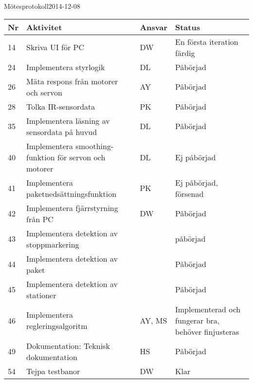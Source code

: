 \documentclass[titlepage, a4paper]{article}
\begin{document}
	\begin{projektmote}{Mötesprotokoll}{2014-12-08}
	\end{projektmote}

	\newpage
	\begin{center}
		\begin{tabularx}{\textwidth}{| p{4mm} | X | p{13.5mm} | X |}
			\hline
			\textbf{Nr} & \textbf{Aktivitet} & \textbf{Ansvar} & \textbf{Status} \\\hline
			{14} & {Skriva UI för PC} & {DW} & {En första iteration färdig} \\\hline
			{24} & {Implementera styrlogik} & {DL} & {Påbörjad} \\\hline
			{26} & {Mäta respons från motorer och servon} & {AY} & {Påbörjad} \\\hline
			{28} & {Tolka IR-sensordata} & {PK} & {Påbörjad} \\\hline
			{35} & {Implementera läsning av sensordata på huvud} & {DL} & {Påbörjad} \\\hline
			{40} & {Implementera smoothing-funktion för servon och motorer} & {DL} & {Ej påbörjad} \\\hline
			{41} & {Implementera paketnedsättningsfunktion} & {PK} & {Ej påbörjad, försenad} \\\hline
			{42} & {Implementera fjärrstyrning från PC} & {DW} & {Påbörjad} \\\hline
			{43} & {Implementera detektion av stoppmarkering} & {} & {påbörjad} \\\hline
			{44} & {Implementera detektion av paket} & {} & {Påbörjad} \\\hline
			{45} & {Implementera detektion av stationer} & {} & {Påbörjad} \\\hline
			{46} & {Implementera regleringsalgoritm} & {AY, MS} & {Implementerad och fungerar bra, behöver finjusteras} \\\hline
			{49} & {Dokumentation: Teknisk dokumentation} & {HS} & {Påbörjad} \\\hline
			{54} & {Tejpa testbanor} & {DW} & {Klar} \\\hline
		\end{tabularx}
	\end{center}
\end{document}
